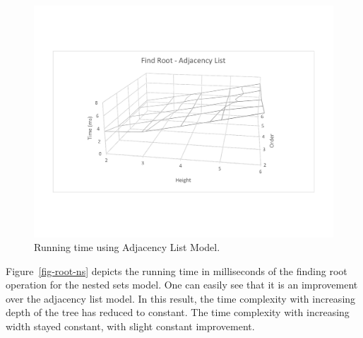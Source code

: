 \begin{figure}[!h]
\begin{center}
\includegraphics[width=6in]{images/root-al-wire.pdf}
\caption{Running time using Adjacency List Model.\label{fig-root-al}}
\end{center}
\end{figure}

Figure~\ref{fig-root-ns} depicts the running time in milliseconds of the finding root operation for the nested sets model. One can easily see that it is an improvement over the adjacency list model. In this result, the time complexity with increasing depth of the tree has reduced to constant. The time complexity with increasing width stayed constant, with slight constant improvement.

